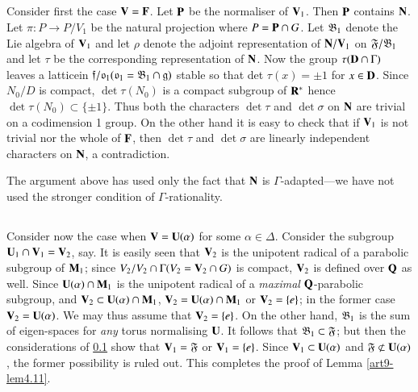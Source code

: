 \subsection{}\label{art9-subsec4.13}
Consider first the case $\mathbf{V} =\mathbf{F}$. Let $\mathbf{P}$ be the normaliser of $\mathbf{V}_1$. Then $\mathbf{P}$ contains $\mathbf{N}$. Let $\pi: P \to P/V_1$ be the natural projection where $P = \mathbf{P}\cap G$. Let $\mathfrak{B}_1$ denote the Lie algebra of $\mathbf{V}_1$ and let $\rho$ denote the adjoint representation of $\mathbf{N} / \mathbf{V}_1$ on $\mathfrak{F}/\mathfrak{B}_1$ and let $\tau$ be the corresponding representation of $\mathbf{N}$. Now the group $\tau (\mathbf{D} \cap \Gamma)$ leaves  a lattice\pageoriginale in $\mathfrak{f}/ \mathfrak{o}_1 (\mathfrak{o}_1 = \mathfrak{B}_1 \cap \mathfrak{g})$ stable so that det $\tau (x) = \pm 1$ for $x \in \mathbf{D}$. Since $N_0/ D$ is compact, $\det \tau (N_0)$ is a compact subgroup of $\mathbf{R}^\ast$ hence $\det \tau (N_0) \subset \{\pm 1\}$. Thus both the characters $\det \tau$ and $\det \sigma$ on $\mathbf{N}$ are trivial on a codimension 1 group. On the other hand it is easy to check that if $\mathbf{V}_1$ is not trivial nor the whole of $\mathbf{F}$, then $\det \tau$ and $\det \sigma$ are linearly independent characters on $\mathbf{N}$, a contradiction.

\begin{note*}
The argument above has used only the fact that $\mathbf{N}$ is $\Gamma$-adapted---we have not used the stronger condition of $\Gamma$-rationality.
\end{note*}

\subsection{}\label{art9-subsec4.14}
Consider now the case when $\mathbf{V} = \mathbf{U} (\alpha)$ for some $\alpha \in \Delta$. Consider the subgroup $\mathbf{U}_1 \cap \mathbf{V}_1 =\mathbf{V}_2$, say. It is easily seen that $\mathbf{V}_2$ is the unipotent radical of a parabolic subgroup of $\mathbf{M}_1$; since $V_2/ V_2 \cap \Gamma(V_2 = \mathbf{V}_2 \cap G)$  is compact, $\mathbf{V}_2$ is defined over $\mathbf{Q}$ as well. Since $\mathbf{U} (\alpha) \cap \mathbf{M}_1$ is the unipotent radical of a \textit{maximal} $\mathbf{Q}$-parabolic subgroup, and $\mathbf{V}_2 \subset \mathbf{U}(\alpha) \cap \mathbf{M}_1$, $\mathbf{V}_2 = \mathbf{U} (\alpha) \cap \mathbf{M}_1$ or $\mathbf{V}_2 = \{e\}$; in the former case $\mathbf{V}_2 = \mathbf{U} (\alpha)$. We may thus assume that $\mathbf{V}_2 = \{e\}$. On the other hand, $\mathfrak{B}_1$ is the sum of eigen-spaces for \textit{any} torus normalising $\mathbf{U}$. It follows that $\mathfrak{B}_1 \subset \mathfrak{F}$; but then the considerations of \ref{art9-subsec4.13} show that $\mathbf{V}_1 = \mathfrak{F}$  or $\mathbf{V}_1 = \{e\}$. Since $\mathbf{V}_1 \subset \mathbf{U} (\alpha)$ and $\mathfrak{F} \not\subset \mathbf{U} (\alpha)$, the former possibility is ruled out. This completes the proof of Lemma \ref{art9-lem4.11}.

